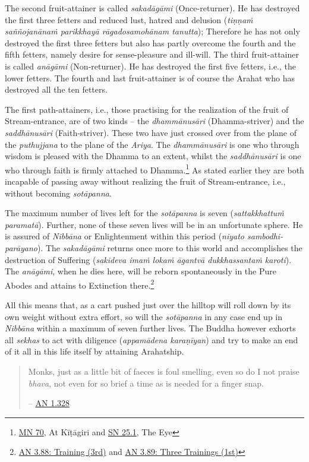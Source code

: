 The second fruit-attainer is called \textit{sakadāgāmi} (Once-returner). He has destroyed the first three fetters and reduced lust, hatred and delusion (\textit{tiṇṇaṁ saññojanānaṁ parikkhayā rāgadosamohānam tanutta}); Therefore he has not only destroyed the first three fetters but also has partly overcome the fourth and the fifth fetters, namely desire for sense-pleasure and ill-will. The third fruit-attainer is called \textit{anāgāmi} (Non-returner). He has destroyed the first five fetters, i.e., the lower fetters. The fourth and last fruit-attainer is of course the Arahat who has destroyed all the ten fetters.

The first path-attainers, i.e., those practising for the realization of the fruit of Stream-entrance, are of two kinds -- the \textit{dhammānusāri} (Dhamma-striver) and the \textit{saddhānusāri} (Faith-striver). These two have just crossed over from the plane of the \textit{puthujjana} to the plane of the \textit{Ariya}. The \textit{dhammānusāri} is one who through wisdom is pleased with the Dhamma to an extent, whilst the \textit{saddhānusāri} is one who through faith is firmly attached to Dhamma.\footnote{\href{https://suttacentral.net/mn70/en/bodhi}{MN 70}, At Kīṭāgiri and \href{https://suttacentral.net/sn25.1/en/sujato}{SN 25.1}, The Eye} As stated earlier they are both incapable of passing away without realizing the fruit of Stream-entrance, i.e., without becoming \textit{sotāpanna}.

The maximum number of lives left for the \textit{sotāpanna} is seven (\textit{sattakkhattuṁ paramatā}). Further, none of these seven lives will be in an unfortunate sphere. He is assured of \textit{Nibbāna} or Enlightenment within this period (\textit{niyato sambodhi-parāyano}). The \textit{sakadāgāmi} returns once more to this world and accomplishes the destruction of Suffering (\textit{sakideva imaṁ lokaṁ āgantvā dukkhassantaṁ karoti}). The \textit{anāgāmi}, when he dies here, will be reborn spontaneously in the Pure Abodes and attains to Extinction there.\footnote{\href{https://suttacentral.net/an3.88/en/sujato}{AN 3.88: Training (3rd)} and \href{https://suttacentral.net/an3.89/en/sujato}{AN 3.89: Three Trainings (1st)}}

All this means that, as a cart pushed just over the hilltop will roll down by its own weight without extra effort, so will the \textit{sotāpanna} in any case end up in \textit{Nibbāna} within a maximum of seven further lives. The Buddha however exhorts all \textit{sekhas} to act with diligence (\textit{appamādena karaṇīyan}) and try to make an end of it all in this life itself by attaining Arahatship.

\begin{quote}
Monks, just as a little bit of faeces is foul smelling, even so do I not praise \textit{bhava}, not even for so brief a time as is needed for a finger snap.

 -- \href{https://suttacentral.net/an1.316-332/en/sujato}{AN 1.328}
\end{quote}
